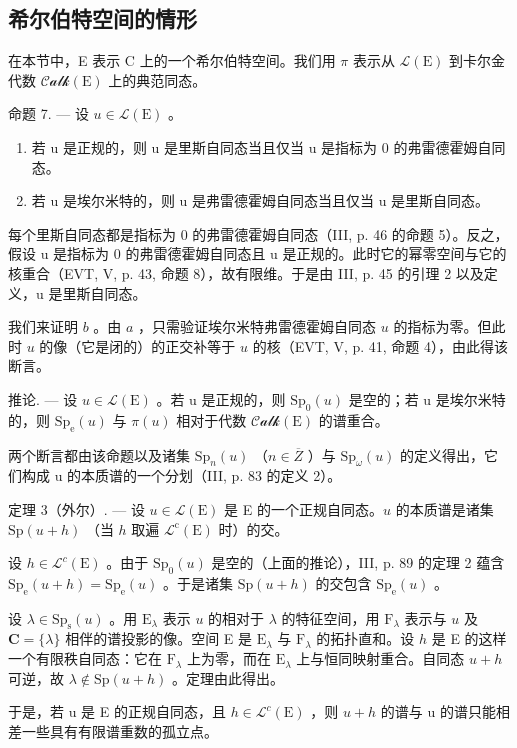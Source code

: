 \subsection{希尔伯特空间的情形}

在本节中，E 表示 C 上的一个希尔伯特空间。我们用 \(\pi\) 表示从 \(\mathcal{L}(\mathrm{E})\) 到卡尔金代数 \(\mathcal{Calk}(\mathrm{E})\) 上的典范同态。

命题 7. --- 设 \(u \in \mathcal{L}(\mathrm{E})\) 。

\begin{enumerate}
\def\labelenumi{\alph{enumi})}
\item
  若 u 是正规的，则 u 是里斯自同态当且仅当 u 是指标为 0 的弗雷德霍姆自同态。
\item
  若 u 是埃尔米特的，则 u 是弗雷德霍姆自同态当且仅当 u 是里斯自同态。
\end{enumerate}

每个里斯自同态都是指标为 0 的弗雷德霍姆自同态（III, p. 46 的命题 5）。反之，假设 u 是指标为 0 的弗雷德霍姆自同态且 u 是正规的。此时它的幂零空间与它的核重合（EVT, V, p. 43, 命题 8），故有限维。于是由 III, p. 45 的引理 2 以及定义，u 是里斯自同态。

我们来证明 \(b\) 。由 \(a\) ，只需验证埃尔米特弗雷德霍姆自同态 \(u\) 的指标为零。但此时 \(u\) 的像（它是闭的）的正交补等于 \(u\) 的核（EVT, V, p. 41, 命题 4），由此得该断言。

推论. --- 设 \(u \in \mathcal{L}(\mathrm{E})\) 。若 u 是正规的，则 \(\mathrm{Sp}_{0}(u)\) 是空的；若 u 是埃尔米特的，则 \(\mathrm{Sp}_{\mathrm{e}}(u)\) 与 \(\pi(u)\) 相对于代数 \(\mathcal{Calk}(\mathrm{E})\) 的谱重合。

两个断言都由该命题以及诸集 \(\mathrm{Sp}_{n}(u)\) （\(n \in \overline{Z}\) ）与 \(\mathrm{Sp}_{\omega}(u)\) 的定义得出，它们构成 u 的本质谱的一个分划（III, p. 83 的定义 2）。

定理 3（外尔）. --- 设 \(u \in \mathcal{L}(\mathrm{E})\) 是 E 的一个正规自同态。\(u\) 的本质谱是诸集 \(\mathrm{Sp}(u + h)\) （当 \(h\) 取遍 \(\mathcal{L}^{\mathrm{c}}(\mathrm{E})\) 时）的交。

设 \(h \in \mathcal{L}^c(\mathrm{E})\) 。由于 \(\mathrm{Sp}_0(u)\) 是空的（上面的推论），III, p. 89 的定理 2 蕴含 \(\mathrm{Sp_e}(u + h) = \mathrm{Sp_e}(u)\) 。于是诸集 \(\mathrm{Sp}(u + h)\) 的交包含 \(\mathrm{Sp_e}(u)\) 。

设 \(\lambda \in \mathrm{Sp}_{\mathrm{s}}(u)\) 。用 \(\mathrm{E}_{\lambda}\) 表示 \(u\) 的相对于 \(\lambda\) 的特征空间，用 \(\mathrm{F}_{\lambda}\) 表示与 \(u\) 及 \(\mathbf{C} = \{\lambda\}\) 相伴的谱投影的像。空间 E 是 \(\mathrm{E}_{\lambda}\) 与 \(\mathrm{F}_{\lambda}\) 的拓扑直和。设 \(h\) 是 E 的这样一个有限秩自同态：它在 \(\mathrm{F}_{\lambda}\) 上为零，而在 \(\mathrm{E}_{\lambda}\) 上与恒同映射重合。自同态 \(u + h\) 可逆，故 \(\lambda \notin \mathrm{Sp}(u + h)\) 。定理由此得出。

于是，若 u 是 E 的正规自同态，且 \(h \in \mathcal{L}^{c}(\mathrm{E})\) ，则 \(u + h\) 的谱与 u 的谱只能相差一些具有有限谱重数的孤立点。
\relax{}
